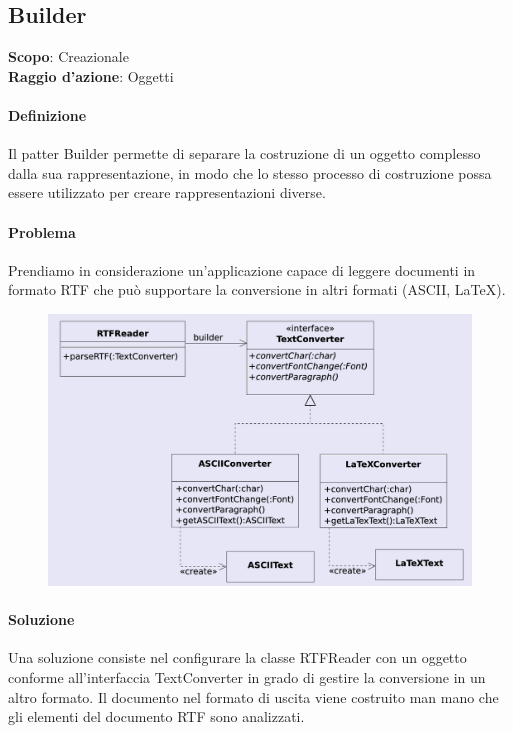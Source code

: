 \subsection{Builder}
\label{builder}

\textbf{Scopo}: Creazionale \\
\textbf{Raggio d'azione}: Oggetti

\paragraph{Definizione} Il patter Builder permette di separare la costruzione di un oggetto complesso dalla sua rappresentazione, in modo che lo stesso processo di costruzione possa essere utilizzato per creare rappresentazioni diverse.

\paragraph{Problema} Prendiamo in considerazione un’applicazione capace di leggere documenti in formato RTF che può supportare la conversione in altri formati (ASCII, LaTeX).

\begin{figure}[H]
    \centering
    \includegraphics[width=1\linewidth]{assets/pattern/builder/builder-esempio.png}
\end{figure}

\paragraph{Soluzione} Una soluzione consiste nel configurare la classe RTFReader con un oggetto conforme all’interfaccia TextConverter in grado di gestire la conversione in un altro formato. Il documento nel formato di uscita viene costruito man mano che gli elementi del documento RTF sono analizzati.

